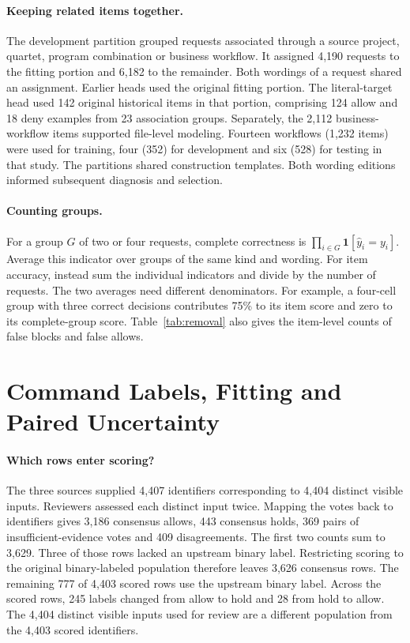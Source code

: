 \paragraph{Keeping related items together.}
The development partition grouped requests associated through a source project, quartet, program combination or business workflow. It assigned 4,190 requests to the fitting portion and 6,182 to the remainder. Both wordings of a request shared an assignment. Earlier heads used the original fitting portion. The literal-target head used 142 original historical items in that portion, comprising 124 allow and 18 deny examples from 23 association groups. Separately, the 2,112 business-workflow items supported file-level modeling. Fourteen workflows (1,232 items) were used for training, four (352) for development and six (528) for testing in that study. The partitions shared construction templates. Both wording editions informed subsequent diagnosis and selection.

\paragraph{Counting groups.}
For a group $G$ of two or four requests, complete correctness is $\prod_{i\in G}\mathbf{1}[\hat y_i=y_i]$. Average this indicator over groups of the same kind and wording. For item accuracy, instead sum the individual indicators and divide by the number of requests. The two averages need different denominators. For example, a four-cell group with three correct decisions contributes 75\% to its item score and zero to its complete-group score. Table~\ref{tab:removal} also gives the item-level counts of false blocks and false allows.

\section{Command Labels, Fitting and Paired Uncertainty}
\label{app:external}
\paragraph{Which rows enter scoring?}
The three sources supplied 4,407 identifiers corresponding to 4,404 distinct visible inputs. Reviewers assessed each distinct input twice. Mapping the votes back to identifiers gives 3,186 consensus allows, 443 consensus holds, 369 pairs of insufficient-evidence votes and 409 disagreements. The first two counts sum to 3,629. Three of those rows lacked an upstream binary label. Restricting scoring to the original binary-labeled population therefore leaves 3,626 consensus rows. The remaining 777 of 4,403 scored rows use the upstream binary label. Across the scored rows, 245 labels changed from allow to hold and 28 from hold to allow. The 4,404 distinct visible inputs used for review are a different population from the 4,403 scored identifiers.

